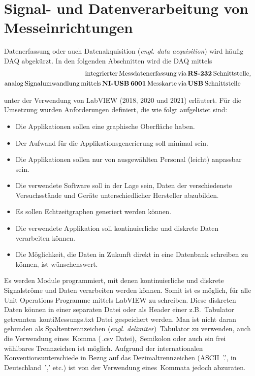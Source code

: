 \section{Signal- und Datenverarbeitung von Mess\-einrichtungen}

Datenerfassung oder auch Datenakquisition (\textit{engl. data acquisition}) wird häufig DAQ abgekürzt. In den folgenden Abschnitten wird die DAQ mittels
\begin{align*}
\mathrm{integrierter\,Messdatenerfassung\,}  &\textrm{via}\, \textbf{RS-232\,} \mathrm{Schnittstelle}, \\
\mathrm{analog\,Signalumwandlung\,mittels\,} \textbf{NI-USB\,6001\,} \mathrm{Messkarte\,} &\textrm{via}\, \textbf{USB\,}\mathrm{Schnittstelle}
\end{align*} 

unter der Verwendung von LabVIEW (2018, 2020 und 2021) erläutert. Für die Umsetzung wurden Anforderungen definiert, die wie folgt aufgelistet sind:

\begin{itemize}[leftmargin=*,labelsep=-\mylen]
\item Die Applikationen sollen eine graphische Oberfläche haben.
\item Der Aufwand für die Applikationsgenerierung soll minimal sein.
\item Die Applikationen sollen nur von ausgewählten Personal (\glqq leicht\grqq{}) anpassbar sein.
\item Die verwendete Software soll in der Lage sein, Daten der verschiedenste Versuchsstände und Geräte unterschiedlicher Hersteller abzubilden.
\item Es sollen Echtzeitgraphen generiert werden können.
\item Die verwendete Applikation soll kontinuierliche und diskrete Daten verarbeiten können.
\item Die Möglichkeit, die Daten in Zukunft direkt in eine Datenbank schreiben zu können, ist wünschenswert.
\end{itemize}


Es werden Module programmiert, mit denen kontinuierliche und diskrete Signalströme und Daten verarbeiten werden können. Somit ist es möglich, für alle Unit Operations Programme mittels LabVIEW zu schreiben. Diese diskreten Daten  können in einer separaten Datei oder als Header einer z.B. \,{\Menlo Tabulator} getrennten \glqq \,{\Menlo kontiMessungs.txt}\grqq{} Datei gespeichert werden. Man ist nicht daran gebunden als Spaltentrennzeichen (\textit{engl. delimiter}) \,{\Menlo Tabulator} zu verwenden, auch die Verwendung eines \,{\Menlo Komma} (\,{\Menlo *.csv} Datei), \,{\Menlo Semikolon} oder auch ein frei wählbares Trennzeichen ist möglich. Aufgrund der internationalen Konventionsunterschiede in Bezug auf das Dezimaltrennzeichen (ASCII \,{\Menlo '.'}, in Deutschland \,{\Menlo ','} etc.)  ist von der Verwendung eines \,{\Menlo Kommata} jedoch abzuraten.

